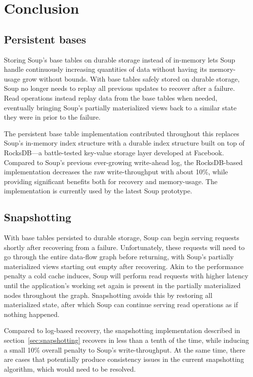 \chapter{Conclusion}\label{chap:conclusion}

\section{Persistent bases}

Storing Soup's base tables on durable storage instead of in-memory lets Soup
handle continuously increasing quantities of data without having its
memory-usage grow without bounds. With base tables safely stored on durable
storage, Soup no longer needs to replay all previous updates to recover after a
failure. Read operations instead replay data from the base tables when needed,
eventually bringing Soup's partially materialized views back to a similar state
they were in prior to the failure.

The persistent base table implementation contributed throughout this replaces
Soup's in-memory index structure with a durable index structure built on top of
RocksDB---a battle-tested key-value storage layer developed at Facebook.
Compared to Soup's previous ever-growing write-ahead log, the RocksDB-based
implementation decreases the raw write-throughput with about 10\%, while
providing significant benefits both for recovery and memory-usage. The
implementation is currently used by the latest Soup prototype.

\section{Snapshotting}

With base tables persisted to durable storage, Soup can begin serving requests
shortly after recovering from a failure. Unfortunately, these requests will need
to go through the entire data-flow graph before returning, with Soup's partially
materialized views starting out empty after recovering. Akin to the performance
penalty a cold cache induces, Soup will perform read requests with higher
latency until the application's working set again is present in the partially
materialized nodes throughout the graph. Snapshotting avoids this by restoring
all materialized state, after which Soup can continue serving read operations as
if nothing happened.

Compared to log-based recovery, the snapshotting implementation described in
section~\ref{sec:snapshotting} recovers in less than a tenth of the time, while
inducing a small 10\% overall penalty to Soup's write-throughput. At the same
time, there are cases that potentially produce consistency issues in the current
snapshotting algorithm, which would need to be resolved.

